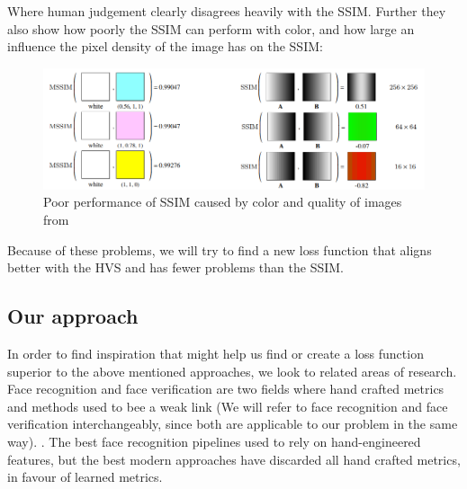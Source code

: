 Where human judgement clearly disagrees heavily with the SSIM. Further they also show how poorly the SSIM can perform with color, and how large an influence the pixel density of the image has on the SSIM\cite{ssimbad}:
\begin{figure}[H]
    \centering
    \includegraphics[width=0.90\linewidth,origin=c]{Report/Pictures/LossFuntion/color_and_cuality_comparison.png}
    \caption{Poor performance of SSIM caused by color and quality of images from\cite{ssimbad}}
    \label{Misalignment HVS SSIM color quality}
\end{figure}

Because of these problems, we will try to find a new loss function that aligns better with the HVS and has fewer problems than the SSIM.


\subsection{Our approach}
In order to find inspiration that might help us find or create a loss function superior to the above mentioned approaches, we look to related areas of research. 
Face recognition and face verification are two fields where hand crafted metrics and methods used to bee a weak link (We will refer to face recognition and face verification interchangeably, since both are applicable to our problem in the same way). \cite{benchmark}\cite{Learning_Fine_grained}\cite{Learning_similarity_metric}\cite{state_of_the_art}. The best face recognition pipelines used to rely on hand-engineered features\cite{state_of_the_art}, but the best modern approaches have discarded all hand crafted metrics, in favour of learned metrics\cite{state_of_the_art}\cite{UltimateAccuracy}\cite{FaceNet}\cite{Deep_Face}. 

